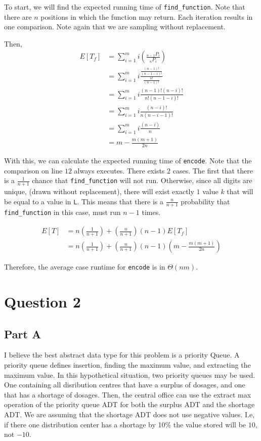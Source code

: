 \documentclass{article}
\begin{document}
\medskip

To start, we will find the expected running time of \verb|find_function|. Note that there are $n$ positions in which the function may return. Each iteration results in one comparison. Note again that we are sampling without replacement.

Then,
\begin{align*}
    E[T_f] & = \sum^m_{i=1} i (\frac{{_{n-1}P_i}}{_n P_i})                      \\
           & = \sum^m_{i=1} i \frac{\frac{(n-1)!}{(n-1-i)!}}{\frac{n!}{(n-1)!}} \\
           & = \sum^m_{i=1} i \frac{(n-1)! (n-i)!}{n!(n-1-i)!}                  \\
           & = \sum^m_{i=1} i \frac{(n-i)!}{n(n-i-1)!}                          \\
           & = \sum^m_{i=1} i \frac{(n-i)}{n}                                   \\
           & = m - \frac{m(m+1)}{2n}
\end{align*}

With this, we can calculate the expected running time of \verb|encode|. Note that the comparison on line $12$ always executes. There exists $2$ cases. The first that there is a $\frac{1}{n+1}$ chance that \verb|find_function| will not run. Otherwise, since all digits are unique, (drawn without replacement), there will exist exactly $1$ value $k$ that will be equal to a value in \verb|L|. This means that there is a $\frac{n}{n+1}$ probability that \verb|find_function| in this case, must run $n-1$ times.

\begin{align*}
    E[T] & = n (\frac{1}{n+1}) + (\frac{n}{n+1})(n-1)E[T_f]                  \\
         & = n (\frac{1}{n+1}) + (\frac{n}{n+1})(n-1)(m - \frac{m(m+1)}{2n})
\end{align*}


Therefore, the average case runtime for \verb|encode| is in $\Theta(nm)$.


\section*{Question 2}

\subsection*{Part A}
I believe the best abstract data type for this problem is a priority Queue. A priority queue defines insertion, finding the maximum value, and extracting the maximum value. In this hypothetical situation, two priority queues may be used. One containing all disribution centres that have a surplus of dosages, and one that has a shortage of dosages. Then, the central office can use the extract max operation of the priority queue ADT for both the surplus ADT and the shortage ADT. We are assuming that the shortage ADT does not use negative values. I.e, if there one distribution center has a shortage by 10\% the value stored will be $10$, not $-10$.
\end{document}
